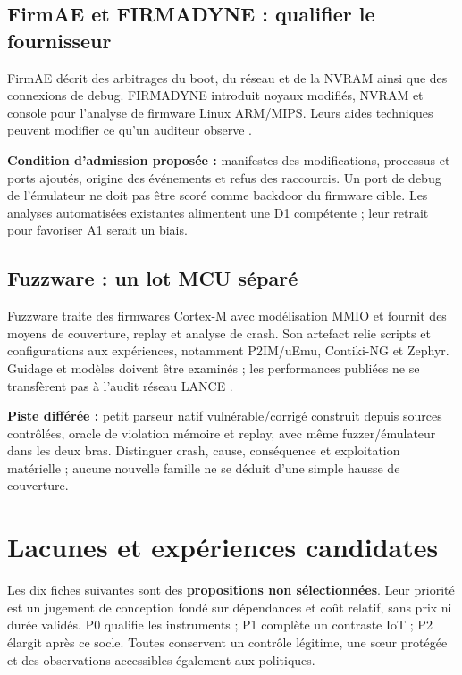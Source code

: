 \documentclass[11pt,a4paper]{article}
\begin{document}
\begin{samepage}\subsection{FirmAE et FIRMADYNE : qualifier le fournisseur}
FirmAE décrit des arbitrages du boot, du réseau et de la NVRAM ainsi que des connexions de debug. FIRMADYNE introduit noyaux modifiés, NVRAM et console pour l'analyse de firmware Linux ARM/MIPS. Leurs aides techniques peuvent modifier ce qu'un auditeur observe \cite{firmae,firmadyne}.
\par\end{samepage}
\textbf{Condition d'admission proposée :} manifestes des modifications, processus et ports ajoutés, origine des événements et refus des raccourcis. Un port de debug de l'émulateur ne doit pas être scoré comme backdoor du firmware cible. Les analyses automatisées existantes alimentent une D1 compétente ; leur retrait pour favoriser A1 serait un biais.

\begin{samepage}\subsection{Fuzzware : un lot MCU séparé}
Fuzzware traite des firmwares Cortex-M avec modélisation MMIO et fournit des moyens de couverture, replay et analyse de crash. Son artefact relie scripts et configurations aux expériences, notamment P2IM/uEmu, Contiki-NG et Zephyr. Guidage et modèles doivent être examinés ; les performances publiées ne se transfèrent pas à l'audit réseau LANCE \cite{fuzzware,fuzzware-exp}.
\par\end{samepage}
\textbf{Piste différée :} petit parseur natif vulnérable/corrigé construit depuis sources contrôlées, oracle de violation mémoire et replay, avec même fuzzer/émulateur dans les deux bras. Distinguer crash, cause, conséquence et exploitation matérielle ; aucune nouvelle famille ne se déduit d'une simple hausse de couverture.

\section{Lacunes et expériences candidates}
Les dix fiches suivantes sont des \textbf{propositions non sélectionnées}. Leur priorité est un jugement de conception fondé sur dépendances et coût relatif, sans prix ni durée validés. P0 qualifie les instruments ; P1 complète un contraste IoT ; P2 élargit après ce socle. Toutes conservent un contrôle légitime, une sœur protégée et des observations accessibles également aux politiques.
\end{document}
